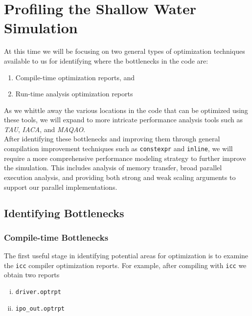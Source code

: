 \section{Profiling the Shallow Water Simulation}
\label{sec-profile}

At this time we will be focusing on two general types of optimization techniques available to us for identifying where the bottlenecks in the code are:

\begin{enumerate}[1.]
    \item Compile-time optimization reports, and
    \item Run-time analysis optimization reports
\end{enumerate}

As we whittle away the various locations in the code that can be optimized using these tools, we will expand to more intricate performance analysis tools such as \emph{TAU}, \emph{IACA}, and \emph{MAQAO}.\\

After identifying these bottlenecks and improving them through general compilation improvement techniques such as \texttt{constexpr} and \texttt{inline}, we will require a more comprehensive performance modeling strategy to further improve the simulation.  This includes analysis of memory transfer, broad parallel execution analysis, and providing both strong and weak scaling arguments to support our parallel implementations.

\subsection{Identifying Bottlenecks}
\label{sec-profile-bottlenecks}

\subsubsection{Compile-time Bottlenecks}
\label{sec-profile-bottlenecks-compile-time}
The first useful stage in identifying potential areas for optimization is to examine the \texttt{icc} compiler optimization reports.  For example, after compiling with \texttt{icc} we obtain two reports

\begin{enumerate}[i)]
    \item \texttt{driver.optrpt}
    \item \texttt{ipo\_out.optrpt}
\end{enumerate}

